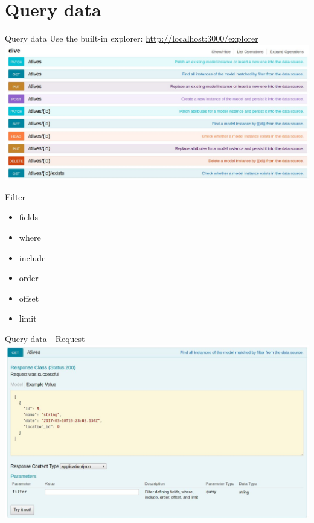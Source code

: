 \documentclass[11pt]{beamer}
\begin{document}
\section{Query data}
\begin{frame}{Query data}
Use the built-in explorer: \url{http://localhost:3000/explorer}\\
\includegraphics[width=\textwidth]{images/explorer-overview.jpg} 
\end{frame}

\begin{frame}{Filter}
\begin{itemize}
\item fields
\item where
\item include
\item order
\item offset
\item limit
\end{itemize}
\end{frame}

\begin{frame}{Query data - Request}
\includegraphics[width=\textwidth]{images/explorer-request.jpg} 
\end{frame}
\end{document}
